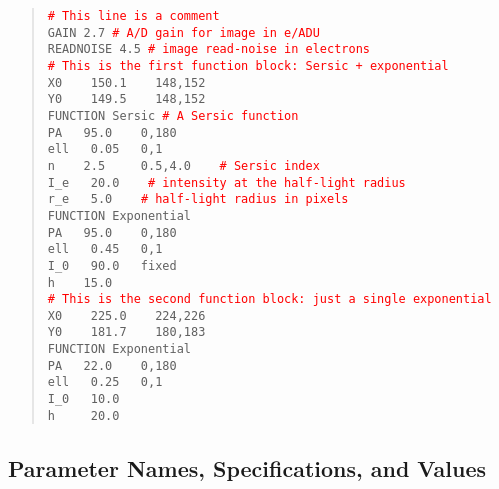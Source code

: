 \documentclass[10pt]{article}
\newcommand{\red}{\textcolor{red}}
\begin{document}
\begin{quote}
  \texttt{\red{\# This line is a comment}}\\
  
  \texttt{GAIN  2.7   \red{\# A/D gain for image in e/ADU}}\\
  \texttt{READNOISE  4.5   \red{\# image read-noise in electrons}}\\
  
  \texttt{\red{\# This is the first function block: Sersic + exponential}}\\
  \texttt{X0 ~~   150.1  ~~ 148,152}\\
  \texttt{Y0 ~~   149.5  ~~ 148,152}\\
  \texttt{FUNCTION   Sersic   \red{\# A Sersic function}}\\
  \texttt{PA  ~  95.0  ~~ 0,180}\\
  \texttt{ell ~   0.05 ~ 0,1}\\
  \texttt{n   ~~   2.5  ~~~ 0.5,4.0 ~~ \red{\# Sersic index}}\\
  \texttt{I\_e ~  20.0 ~~ \red{\# intensity at the half-light radius}}\\
  \texttt{r\_e ~    5.0 ~~ \red{\# half-light radius in pixels}}\\
  \texttt{FUNCTION   Exponential}\\
  \texttt{PA   ~ 95.0  ~~ 0,180}\\
  \texttt{ell  ~  0.45  ~~0,1}\\
  \texttt{I\_0 ~  90.0  ~ fixed}\\
  \texttt{h    ~~ 15.0}\\
  
  \texttt{\red{\# This is the second function block: just a single exponential}}\\
  \texttt{X0 ~~   225.0  ~~ 224,226}\\
  \texttt{Y0 ~~   181.7  ~~ 180,183}\\
  \texttt{FUNCTION   Exponential} \\
  \texttt{PA   ~ 22.0  ~~ 0,180      }\\
  \texttt{ell  ~  0.25 ~ 0,1}\\
  \texttt{I\_0 ~  10.0  }\\
  \texttt{h   ~~~  20.0}\\
\end{quote}


\subsection{Parameter Names, Specifications, and Values}
\end{document}
